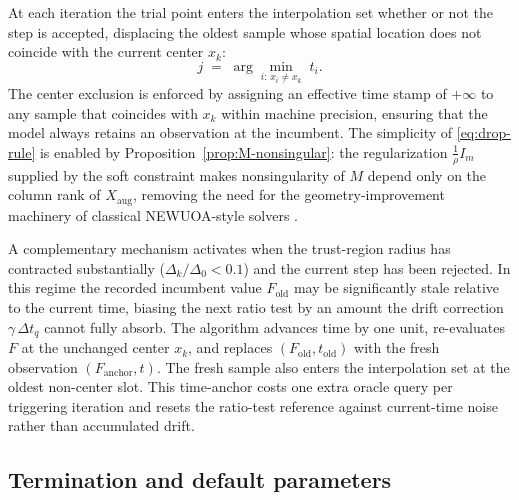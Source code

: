 \documentclass[11pt,a4paper]{article}
\begin{document}
At each iteration the trial point enters the interpolation set
whether or not the step is accepted, displacing the oldest sample
whose spatial location does not coincide with the current center
$x_k$:
\begin{equation}\label{eq:drop-rule}
  j \;=\; \arg\min_{i:\, x_i \neq x_k}\; t_i.
\end{equation}
The center exclusion is enforced by assigning an effective time
stamp of $+\infty$ to any sample that coincides with $x_k$ within
machine precision, ensuring that the model always retains an
observation at the incumbent. The simplicity of \eqref{eq:drop-rule}
is enabled by Proposition~\ref{prop:M-nonsingular}: the
regularization $\tfrac{1}{\rho}I_m$ supplied by the soft constraint
makes nonsingularity of $M$ depend only on the column rank of
$X_{\mathrm{aug}}$, removing the need for the geometry-improvement
machinery of classical NEWUOA-style solvers
\cite{Powell2006NEWUOA, ConnScheinbergVicente2009}.

A complementary mechanism activates when the trust-region radius
has contracted substantially ($\Delta_k / \Delta_0 < 0.1$) and the
current step has been rejected. In this regime the recorded
incumbent value $F_{\mathrm{old}}$ may be significantly stale
relative to the current time, biasing the next ratio test by an
amount the drift correction $\gamma\,\Delta t_q$ cannot fully
absorb. The algorithm advances time by one unit, re-evaluates
$F$ at the unchanged center $x_k$, and replaces
$(F_{\mathrm{old}}, t_{\mathrm{old}})$ with the fresh observation
$(F_{\mathrm{anchor}}, t)$. The fresh sample also enters the
interpolation set at the oldest non-center slot. This time-anchor
costs one extra oracle query per triggering iteration and resets
the ratio-test reference against current-time noise rather than
accumulated drift.

\subsection{Termination and default parameters}
\label{sec:termination}
\end{document}
